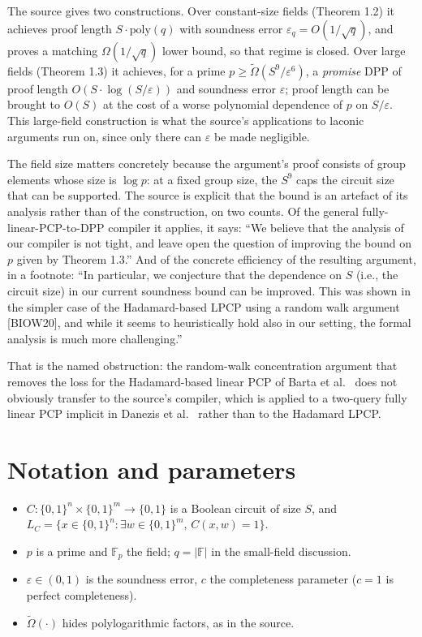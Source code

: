 \documentclass{aicr-conjecture}
\newcommand{\F}{\mathbb{F}}
\newcommand{\eps}{\varepsilon}
\newcommand{\Omt}{\widetilde{\Omega}}
\newcommand{\Om}{\Omega}
\begin{document}
The source gives two constructions. Over constant-size fields
(Theorem 1.2) it achieves proof length $S \cdot \mathrm{poly}(q)$ with
soundness error $\eps_{q} = O(1/\sqrt{q})$, and proves a matching
$\Om(1/\sqrt{q})$ lower bound, so that regime is closed. Over large
fields (Theorem 1.3) it achieves, for a prime $p \ge
\Omt(S^{9}/\eps^{6})$, a \emph{promise} DPP of proof length $O(S \cdot
\log(S/\eps))$ and soundness error $\eps$; proof length can be brought
to $O(S)$ at the cost of a worse polynomial dependence of $p$ on
$S/\eps$. This large-field construction is what the source's
applications to laconic arguments run on, since only there can $\eps$ be
made negligible.

The field size matters concretely because the argument's proof consists
of group elements whose size is $\log p$: at a fixed group size, the
$S^{9}$ caps the circuit size that can be supported. The source is
explicit that the bound is an artefact of its analysis rather than of the
construction, on two counts. Of the general fully-linear-PCP-to-DPP
compiler it applies, it says: ``We believe that the analysis of our
compiler is not tight, and leave open the question of improving the bound
on $p$ given by Theorem 1.3.'' And of the concrete efficiency of the
resulting argument, in a footnote: ``In particular, we conjecture that
the dependence on $S$ (i.e., the circuit size) in our current soundness
bound can be improved. This was shown in the simpler case of the
Hadamard-based LPCP using a random walk argument [BIOW20], and while it
seems to heuristically hold also in our setting, the formal analysis is
much more challenging.''

That is the named obstruction: the random-walk concentration argument
that removes the loss for the Hadamard-based linear PCP of Barta et
al.~\cite{BIOW20} does not obviously transfer to the source's compiler,
which is applied to a two-query fully linear PCP implicit in
Danezis et al.~\cite{DFGK14} rather than to the Hadamard LPCP\@.

\section{Notation and parameters}\label{sec:notation}

\begin{itemize}[nosep]
  \item $C : \{0,1\}^{n} \times \{0,1\}^{m} \to \{0,1\}$ is a Boolean
    circuit of size $S$, and $L_{C} = \{x \in \{0,1\}^{n} : \exists w
    \in \{0,1\}^{m},\, C(x,w) = 1\}$.
  \item $p$ is a prime and $\F_{p}$ the field; $q = |\F|$ in the
    small-field discussion.
  \item $\eps \in (0,1)$ is the soundness error, $c$ the completeness
    parameter ($c = 1$ is perfect completeness).
  \item $\Omt(\cdot)$ hides polylogarithmic factors, as in the source.
\end{itemize}
\end{document}
